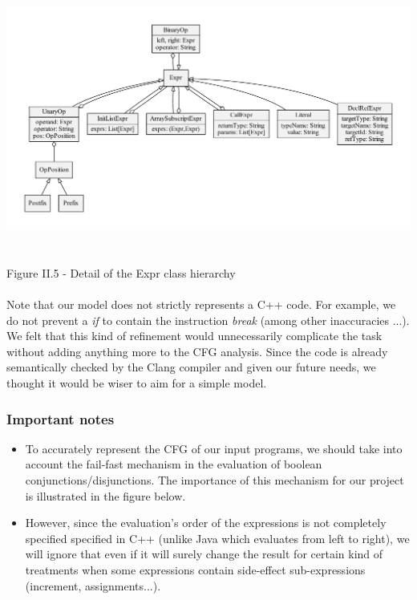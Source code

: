 \documentclass{report}
\begin{document}
\begin{center}
\includegraphics[scale=0.5]{data/Expr_classes}
~\\~\\Figure II.5 - Detail of the Expr class hierarchy
\end{center}

\paragraph{}
\hspace{4mm}Note that our model does not strictly represents a C++ code. For example, we do not prevent a \textit{if} to contain the instruction \textit{break}
(among other inaccuracies ...). We felt that this kind of refinement would unnecessarily complicate the task without adding anything more to the CFG analysis. 
Since the code is already semantically checked by the Clang compiler and given our future needs, we thought it would be wiser to aim for a simple model.

\subsubsection{Important notes}

\vspace{1.5mm}
\begin{itemize}
\item To accurately represent the CFG of our input programs, we should take into account the fail-fast mechanism in the evaluation of boolean conjunctions/disjunctions.
The importance of this mechanism for our project is illustrated in the figure below.\vspace{1mm}
\item However, since the evaluation's order of the expressions is not completely specified specified in C++ (unlike Java which evaluates from left to right),
we will ignore that even if it will surely change the result for certain kind of treatments when some expressions contain side-effect sub-expressions
 (increment, assignments...).\vspace{1mm}
\end{itemize}
\end{document}
